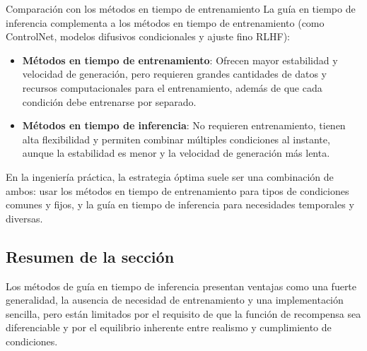 \begin{knowledgebox}{Comparación con los métodos en tiempo de entrenamiento}
La guía en tiempo de inferencia complementa a los métodos en tiempo de entrenamiento (como ControlNet, modelos difusivos condicionales y ajuste fino RLHF):
\begin{itemize}
    \item \textbf{Métodos en tiempo de entrenamiento}: Ofrecen mayor estabilidad y velocidad de generación, pero requieren grandes cantidades de datos y recursos computacionales para el entrenamiento, además de que cada condición debe entrenarse por separado.
    \item \textbf{Métodos en tiempo de inferencia}: No requieren entrenamiento, tienen alta flexibilidad y permiten combinar múltiples condiciones al instante, aunque la estabilidad es menor y la velocidad de generación más lenta.
\end{itemize}
En la ingeniería práctica, la estrategia óptima suele ser una combinación de ambos: usar los métodos en tiempo de entrenamiento para tipos de condiciones comunes y fijos, y la guía en tiempo de inferencia para necesidades temporales y diversas.
\end{knowledgebox}

\subsection{Resumen de la sección}

Los métodos de guía en tiempo de inferencia presentan ventajas como una fuerte generalidad, la ausencia de necesidad de entrenamiento y una implementación sencilla, pero están limitados por el requisito de que la función de recompensa sea diferenciable y por el equilibrio inherente entre realismo y cumplimiento de condiciones.

